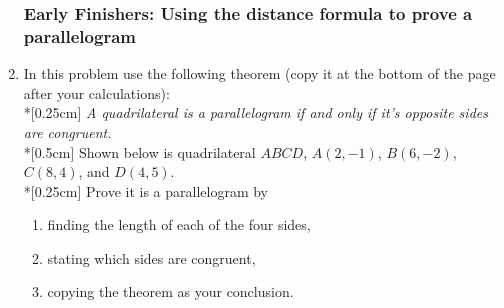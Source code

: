 \documentclass[12pt, twoside]{article}
\begin{document}
\begin{enumerate}
\newpage
\subsubsection*{Early Finishers: Using the distance formula to prove a parallelogram}
\item In this problem use the following theorem (copy it at the bottom of the page after your calculations): \\*[0.25cm]
  \emph{A quadrilateral is a parallelogram if and only if it's opposite sides are congruent.}\\*[0.5cm]
  Shown below is quadrilateral $ABCD$, $A(2,-1)$, $B(6,-2)$, $C(8,4)$, and $D(4,5)$. \\*[0.25cm]
  Prove it is a parallelogram by
  \begin{enumerate}
    \item finding the length of each of the four sides,
    \item stating which sides are congruent,
    \item copying the theorem as your conclusion.
  \end{enumerate}
  \begin{flushright} %
  \end{flushright}


\end{enumerate}
\end{document}
